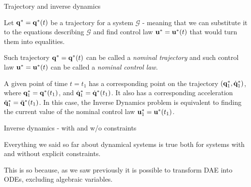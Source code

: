 \documentclass{beamer}
\begin{document}
\begin{frame}{Trajectory and inverse dynamics}
	\begin{flushleft}
		
		Let $\mathbf{q}^*=\mathbf{q}^*(t)$ be a trajectory for a system $\mathcal{G}$ - meaning that we can substitute it to the equations describing $\mathcal{G}$ and find control law $\mathbf{u}^*=\mathbf{u}^*(t)$ that would turn them into equalities. 
		
		\bigskip
		
		Such trajectory $\mathbf{q}^*=\mathbf{q}^*(t)$ can be called a \emph{nominal trajectory} and such control law $\mathbf{u}^*=\mathbf{u}^*(t)$ can be called a \emph{nominal control law}.
		
		\bigskip
		
		A given point of time $t = t_1$ has a corresponding point on the trajectory $(\mathbf{q}_1^*, \dot{\mathbf{q}}_1^*)$, where $\mathbf{q}_1^*=\mathbf{q}^*(t_1)$, and $ \dot{\mathbf{q}}_1^*= \dot{\mathbf{q}}^*(t_1)$. It also has a corresponding acceleration $ \ddot{\mathbf{q}}_1^*= \ddot{\mathbf{q}}^*(t_1)$. In this case, the Inverse Dynamics problem is equivalent to finding the current value of the nominal control law $\mathbf{u}_1^*=\mathbf{u}^*(t_1)$.
		
	\end{flushleft}
\end{frame}



\begin{frame}{Inverse dynamics - with and w/o constraints}
	\begin{flushleft}
		
		Everything we said so far about dynamical systems is true both for systems with and without explicit constraints.
		
		\bigskip
		
		This is so because, as we saw previously it is possible to transform DAE into ODEs, excluding algebraic variables.
		
	\end{flushleft}
\end{frame}
\end{document}

